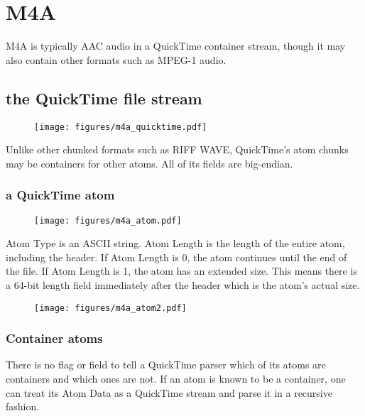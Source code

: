 \chapter{M4A}

M4A is typically AAC audio in a QuickTime container stream, though
it may also contain other formats such as MPEG-1 audio.

\section{the QuickTime file stream}
\begin{figure}[h]
\texttt{[image: figures/m4a\_quicktime.pdf]}
\end{figure}
\par
\noindent
Unlike other chunked formats such as RIFF WAVE, QuickTime's atom chunks
may be containers for other atoms.  All of its fields are big-endian.
\subsection{a QuickTime atom}
\begin{figure}[h]
\texttt{[image: figures/m4a\_atom.pdf]}
\end{figure}
Atom Type is an ASCII string.
Atom Length is the length of the entire atom, including the header.
If Atom Length is 0, the atom continues until the end of the file.
If Atom Length is 1, the atom has an extended size.  This means
there is a 64-bit length field immediately after the header which is
the atom's actual size.
\begin{figure}[h]
\texttt{[image: figures/m4a\_atom2.pdf]}
\end{figure}
\subsection{Container atoms}
There is no flag or field to tell a QuickTime parser which
of its atoms are containers and which ones are not.
If an atom is known to be a container, one can treat its Atom Data
as a QuickTime stream and parse it in a recursive fashion.
